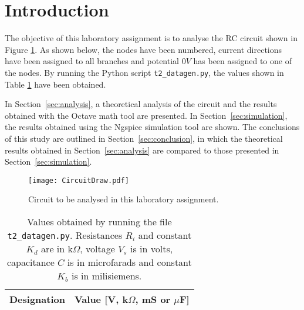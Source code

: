 \section{Introduction}
\label{sec:introduction}

The objective of this laboratory assignment is to analyse the RC circuit shown in Figure \ref{fig:CircuitDraw}. As shown below, the nodes have been numbered, current directions have been assigned to all branches and potential $0V$ has been assigned to one of the nodes. By running the Python script \texttt{t2\_datagen.py}, the values shown in Table \ref{tab:GivenValues} have been obtained.
\par
In Section~\ref{sec:analysis}, a theoretical analysis of the circuit and the results obtained with the Octave math tool are presented. In Section~\ref{sec:simulation}, the results obtained using the Ngspice simulation tool are shown. The conclusions of this study are outlined in Section~\ref{sec:conclusion}, in which the theoretical results obtained in Section~\ref{sec:analysis} are compared to those presented in Section~\ref{sec:simulation}.

\begin{figure}[H] \centering
  \texttt{[image: CircuitDraw.pdf]}
  \caption{Circuit to be analysed in this laboratory assignment.}
  \label{fig:CircuitDraw}
\end{figure}


\begin{table}[H]
  \centering
  \begin{tabular}{|c|c|}
    \hline    
    {\bf Designation} & {\bf Value [V, k$\Omega$, mS or $\mu$F]} \\ \hline
    
  \end{tabular}
  \caption{Values obtained by running the file \texttt{t2\_datagen.py}. Resistances $R_i$ and constant $K_d$ are in k$\Omega$, voltage $V_s$ is in volts, capacitance $C$ is in microfarads and constant $K_b$ is in milisiemens.}
  \label{tab:GivenValues}
\end{table}

